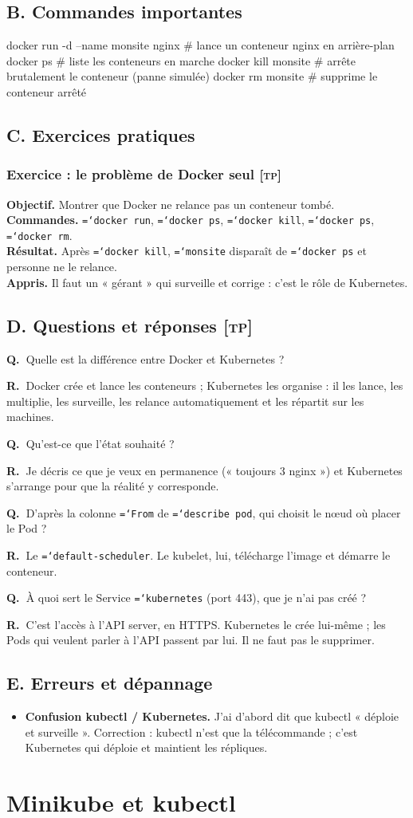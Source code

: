 \documentclass[11pt,a4paper]{article}
\newcommand{\cmd}[1]{\texttt{\hyphenchar\font=`\-#1}}
\newcommand{\tp}{\textsc{[tp]}}
\newcommand{\QR}[2]{\needspace{4\baselineskip}\par\noindent\textbf{Q.~}#1\par\nopagebreak\noindent\textbf{R.~}#2\par\medskip}
\newcommand{\partie}[1]{\needspace{9\baselineskip}\subsection*{#1}}
\newcommand{\exo}[1]{\needspace{8\baselineskip}\subsubsection*{#1}}
\begin{document}
\partie{B. Commandes importantes}
\begin{code}
docker run -d --name monsite nginx   # lance un conteneur nginx en arrière-plan
docker ps                            # liste les conteneurs en marche
docker kill monsite                  # arrête brutalement le conteneur (panne simulée)
docker rm monsite                    # supprime le conteneur arrêté
\end{code}

\partie{C. Exercices pratiques}
\exo{Exercice : le problème de Docker seul \tp}
\textbf{Objectif.} Montrer que Docker ne relance pas un conteneur tombé.\\
\textbf{Commandes.} \cmd{docker run}, \cmd{docker ps}, \cmd{docker kill}, \cmd{docker ps}, \cmd{docker rm}.\\
\textbf{Résultat.} Après \cmd{docker kill}, \cmd{monsite} disparaît de \cmd{docker ps} et personne ne le relance.\\
\textbf{Appris.} Il faut un « gérant » qui surveille et corrige : c'est le rôle de Kubernetes.

\partie{D. Questions et réponses \tp}
\QR{Quelle est la différence entre Docker et Kubernetes ?}{Docker crée et lance les conteneurs ; Kubernetes les organise : il les lance, les multiplie, les surveille, les relance automatiquement et les répartit sur les machines.}
\QR{Qu'est-ce que l'état souhaité ?}{Je décris ce que je veux en permanence (« toujours 3 nginx ») et Kubernetes s'arrange pour que la réalité y corresponde.}
\QR{D'après la colonne \cmd{From} de \cmd{describe pod}, qui choisit le nœud où placer le Pod ?}{Le \cmd{default-scheduler}. Le kubelet, lui, télécharge l'image et démarre le conteneur.}
\QR{À quoi sert le Service \cmd{kubernetes} (port 443), que je n'ai pas créé ?}{C'est l'accès à l'API server, en HTTPS. Kubernetes le crée lui-même ; les Pods qui veulent parler à l'API passent par lui. Il ne faut pas le supprimer.}

\partie{E. Erreurs et dépannage}
\begin{itemize}
  \item \textbf{Confusion kubectl / Kubernetes.} J'ai d'abord dit que kubectl « déploie et surveille ». Correction : kubectl n'est que la télécommande ; c'est Kubernetes qui déploie et maintient les répliques.
\end{itemize}

\section{Minikube et kubectl}
\end{document}
